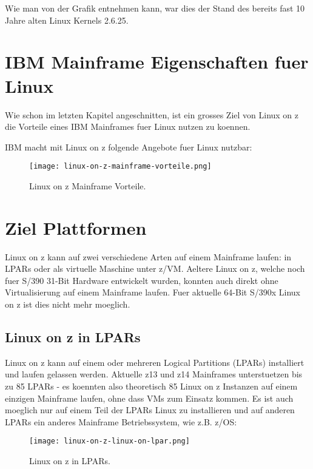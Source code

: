 Wie man von der Grafik entnehmen kann, war dies der Stand des bereits fast 10 Jahre alten Linux Kernels 2.6.25.

\section{IBM Mainframe Eigenschaften fuer Linux}

Wie schon im letzten Kapitel angeschnitten, ist ein grosses Ziel von Linux on z die Vorteile eines IBM Mainframes fuer Linux nutzen zu koennen.

IBM macht mit Linux on z folgende Angebote fuer Linux nutzbar:

\begin{figure}[h!]
\centering
\texttt{[image: linux-on-z-mainframe-vorteile.png]}
\caption{Linux on z Mainframe Vorteile\cite{LinuxOnZMainframeVorteile}.}
\label{fig:LinuxOnZMainframeVorteile}
\end{figure}

\section{Ziel Plattformen}

Linux on z kann auf zwei verschiedene Arten auf einem Mainframe laufen: in LPARs oder als virtuelle Maschine unter z/VM. Aeltere Linux on z, welche noch fuer S/390 31-Bit Hardware entwickelt wurden, konnten auch direkt ohne Virtualisierung auf einem Mainframe laufen.
Fuer aktuelle 64-Bit S/390x Linux on z ist dies nicht mehr moeglich.

\subsection{Linux on z in LPARs}

Linux on z kann auf einem oder mehreren Logical Partitions (LPARs) installiert und laufen gelassen werden. Aktuelle z13 und z14 Mainframes unterstuetzen bis zu 85 LPARs - es koennten also theoretisch 85 Linux on z Instanzen auf einem einzigen Mainframe laufen, ohne dass VMs zum Einsatz kommen.
Es ist auch moeglich nur auf einem Teil der LPARs Linux zu installieren und auf anderen LPARs ein anderes Mainframe Betriebssystem, wie z.B. z/OS:

\begin{figure}[h!]
\centering
\texttt{[image: linux-on-z-linux-on-lpar.png]}
\caption{Linux on z in LPARs\cite{LinuxOnZOnLPAR}.}
\label{fig:LinuxOnZOnLPAR}
\end{figure}

